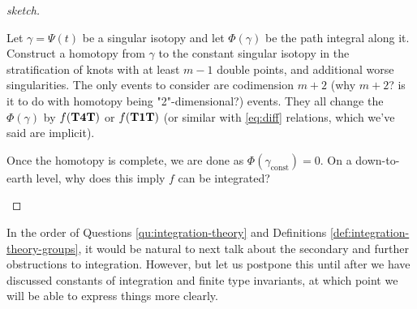 \begin{proof}[sketch]
	\begin{mdframed}
		Let \(\gamma = \Psi(t)\) be a singular isotopy and let \(\Phi(\gamma)\) be the path integral along it. Construct a homotopy from \(\gamma\) to the constant singular isotopy in the stratification of knots with at least \(m - 1\) double points, and additional worse singularities. The only events to consider are codimension \(m + 2\) (why \(m + 2\)? is it to do with homotopy being "2"-dimensional?) events. They all change the \(\Phi(\gamma)\) by \(f(\mathbf{T4T})\) or \(f(\mathbf{T1T})\) (or similar with \ref{eq:diff} relations, which we've said are implicit).

		Once the homotopy is complete, we are done as \(\Phi(\gamma_{\text{const}}) = 0\). On a down-to-earth level, why does this imply \(f\) can be integrated?
	\end{mdframed}
\end{proof}

In the order of Questions \ref{qu:integration-theory} and Definitions \ref{def:integration-theory-groups}, it would be natural to next talk about the secondary and further obstructions to integration. However, but let us postpone this until after we have discussed constants of integration and finite type invariants, at which point we will be able to express things more clearly.


